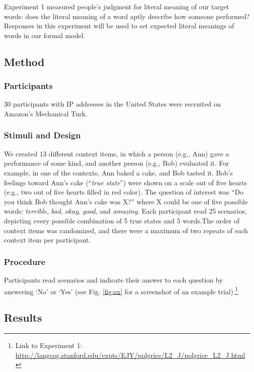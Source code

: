 \documentclass[10pt,letterpaper]{article}
\begin{document}
Experiment 1 measured people's judgment for literal meaning of our target words:
does the literal meaning of a word aptly describe how someone performed?
Responses in this experiment will be used to set expected literal meanings of words in our formal model.

\subsection{Method}

\subsubsection{Participants}

30 participants with IP addresses in the United States were recruited on Amazon's Mechanical Turk.

\subsubsection{Stimuli and Design}

We created 13 different context items, in which a person (e.g., Ann) gave a performance of some kind, and another person (e.g., Bob) evaluated it. For example, in one of the contexts, Ann baked a cake, and Bob tasted it. Bob's feelings toward Ann's cake (``\emph{true state}'') were shown on a scale out of five hearts (e.g., two out of five hearts filled in red color). The question of interest was ``Do you think Bob thought Ann's cake was X?'' where X could be one of five possible words: \emph{terrible}, \emph{bad}, \emph{okay}, \emph{good}, and \emph{amazing}. Each participant read 25 scenarios, depicting every possible combination of 5 true states and 5 words.The order of context items was randomized, and there were a maximum of two repeats of each context item per participant.

\subsubsection{Procedure}

Participants read scenarios and indicate their answer to each question by answering `No' or `Yes' (see Fig. \ref{fig:ex} for a screenshot of an example trial).\footnote{Link to Experiment 1: \url{http://langcog.stanford.edu/expts/EJY/polgrice/L2_J/polgrice_L2_J.html}}

\subsection{Results}
\end{document}
